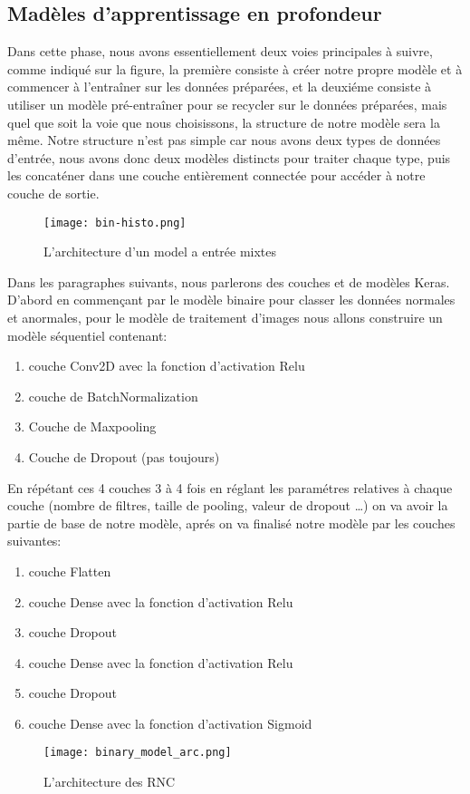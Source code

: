 \subsection{Madèles d'apprentissage en profondeur}
Dans cette phase, nous avons essentiellement deux voies principales à suivre, comme indiqué sur la figure, la première consiste à créer notre propre modèle et à commencer à l'entraîner sur les données préparées, et la deuxiéme consiste à utiliser un modèle pré-entraîner pour se recycler sur le données préparées, mais quel que soit la voie que nous choisissons, la structure de notre modèle sera la même.
Notre structure n'est pas simple car nous avons deux types de données d'entrée, nous avons donc deux modèles distincts pour traiter chaque type, puis les concaténer dans une couche entièrement connectée pour accéder à notre couche de sortie.
\begin{figure}[H]
    \centering
    \texttt{[image: bin-histo.png]}
    \caption{L’architecture d'un model a entrée mixtes}\label{fig:mixed_inpu}
\end{figure}
Dans les paragraphes suivants, nous parlerons des couches et de modèles Keras.
D’abord en commençant par le modèle binaire pour classer les données normales et anormales, pour le modèle de traitement d'images nous allons construire un modèle séquentiel contenant:
\begin{enumerate}
    \item couche Conv2D avec la fonction d'activation Relu
    \item couche de BatchNormalization
    \item Couche de Maxpooling
    \item Couche de Dropout (pas toujours)
\end{enumerate}
En répétant ces 4 couches 3 à 4 fois en réglant les paramétres relatives à chaque couche (nombre de filtres, taille de pooling, valeur de dropout …) on va avoir la partie de base de notre modèle, aprés on va finalisé notre modèle par les couches suivantes:
\begin{enumerate}
    \item couche Flatten
    \item couche Dense avec la fonction d'activation Relu
    \item couche Dropout
    \item couche Dense avec la fonction d'activation Relu
    \item couche Dropout
    \item couche Dense avec la fonction d'activation Sigmoid
\end{enumerate}
\begin{figure}[H]
    \centering
    \texttt{[image: binary\_model\_arc.png]}
    \caption{L’architecture des RNC}\label{fig:binary_arc}
\end{figure}

